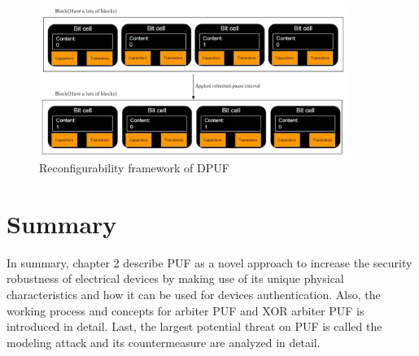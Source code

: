 \begin{figure}[htp]
    \centering
    \includegraphics[width=10cm]{figures/figure9.jpg}
    \caption{Reconfigurability framework of DPUF}
    \label{fig:figure9}
    \end{figure}

\section{Summary}
In summary, chapter 2 describe PUF as a novel approach to increase the security robustness of electrical devices by making use of its unique physical characteristics and how it can be used
for devices authentication. Also, the working process and concepts for arbiter PUF and XOR arbiter PUF is introduced in detail. Last, the largest potential threat on PUF is called the modeling attack 
and its countermeasure are analyzed in detail.


